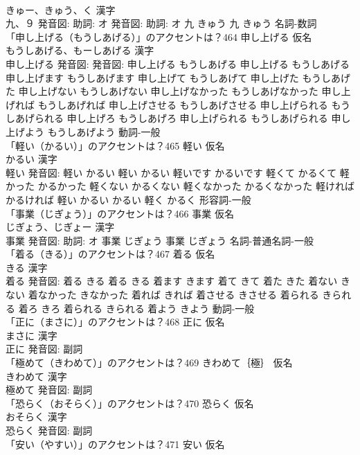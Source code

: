 \documentclass[8pt]{extreport}
\begin{document}
\begin{CJK}{UTF8}{min}
\\	きゅー、きゅう、く 漢字　
\\	九、９ 発音図: 助詞: オ 発音図: 助詞: オ	九 きゅう		九 きゅう				名詞-数詞 
\\	「申し上げる（もうしあげる）」のアクセントは？464	申し上げる 仮名　
\\	もうしあげる、もーしあげる 漢字　
\\	申し上げる 発音図: 発音図:	申し上げる もうしあげる		申し上げる もうしあげる 申し上げます もうしあげます 申し上げて もうしあげて 申し上げた もうしあげた 申し上げない もうしあげない 申し上げなかった もうしあげなかった 申し上げれば もうしあげれば 申し上げさせる もうしあげさせる 申し上げられる もうしあげられる 申し上げろ もうしあげろ 申し上げられる もうしあげられる 申し上げよう もうしあげよう				動詞-一般 
\\	「軽い（かるい）」のアクセントは？465	軽い 仮名　
\\	かるい 漢字　
\\	軽い 発音図:	軽い かるい		軽い かるい 軽いです かるいです 軽くて かるくて 軽かった かるかった 軽くない かるくない 軽くなかった かるくなかった 軽ければ かるければ 軽い かるい かるい 軽く かるく				形容詞-一般 
\\	「事業（じぎょう）」のアクセントは？466	事業 仮名　
\\	じぎょう、じぎょー 漢字　
\\	事業 発音図: 助詞: オ	事業 じぎょう		事業 じぎょう				名詞-普通名詞-一般 
\\	「着る（きる）」のアクセントは？467	着る 仮名　
\\	きる 漢字　
\\	着る 発音図:	着る きる		着る きる 着ます きます 着て きて 着た きた 着ない きない 着なかった きなかった 着れば きれば 着させる きさせる 着られる きられる 着ろ きろ 着られる きられる 着よう きよう				動詞-一般 
\\	「正に（まさに）」のアクセントは？468	正に 仮名　
\\	まさに 漢字　
\\	正に 発音図:							副詞 
\\	「極めて（きわめて）」のアクセントは？469	きわめて｛極｝ 仮名　
\\	きわめて 漢字　
\\	極めて 発音図:							副詞 
\\	「恐らく（おそらく）」のアクセントは？470	恐らく 仮名　
\\	おそらく 漢字　
\\	恐らく 発音図:							副詞 
\\	「安い（やすい）」のアクセントは？471	安い 仮名　

\end{CJK}
\end{document}
